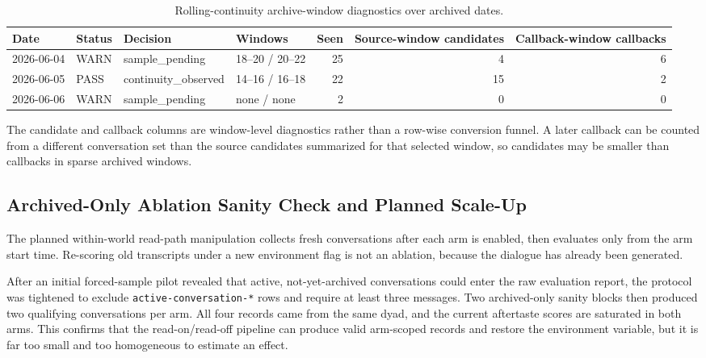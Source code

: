 \documentclass[11pt]{article}
\begin{document}
\begin{table}[t]
\centering
\caption{Rolling-continuity archive-window diagnostics over archived dates.}
\label{tab:repeatability}
\begin{tabular}{llllrrr}
\toprule
Date & Status & Decision & Windows & Seen & Source-window candidates & Callback-window callbacks \\
\midrule
2026-06-04 & WARN & sample\_pending & 18--20 / 20--22 & 25 & 4 & 6 \\
2026-06-05 & PASS & continuity\_observed & 14--16 / 16--18 & 22 & 15 & 2 \\
2026-06-06 & WARN & sample\_pending & none / none & 2 & 0 & 0 \\
\bottomrule
\end{tabular}
\end{table}

The candidate and callback columns are window-level diagnostics rather than a
row-wise conversion funnel. A later callback can be counted from a different
conversation set than the source candidates summarized for that selected window,
so candidates may be smaller than callbacks in sparse archived windows.

\subsection{Archived-Only Ablation Sanity Check and Planned Scale-Up}

The planned within-world read-path manipulation collects fresh conversations after each arm is enabled, then evaluates only from the arm start time. Re-scoring old transcripts under a new environment flag is not an ablation, because the dialogue has already been generated.

After an initial forced-sample pilot revealed that active, not-yet-archived conversations could enter the raw evaluation report, the protocol was tightened to exclude \texttt{active-conversation-*} rows and require at least three messages. Two archived-only sanity blocks then produced two qualifying conversations per arm. All four records came from the same dyad, and the current aftertaste scores are saturated in both arms. This confirms that the read-on/read-off pipeline can produce valid arm-scoped records and restore the environment variable, but it is far too small and too homogeneous to estimate an effect.
\end{document}
